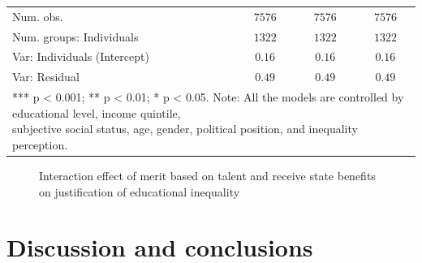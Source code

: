\documentclass[
]{article}
\begin{document}
\begin{table}
{\begin{center}
{\begin{tabular}{l c c c}
Num. obs.                              & $7576$       & $7576$       & $7576$       \\
Num. groups: Individuals               & $1322$       & $1322$       & $1322$       \\
Var: Individuals (Intercept)           & $0.16$       & $0.16$       & $0.16$       \\
Var: Residual                          & $0.49$       & $0.49$       & $0.49$       \\
\hline
\multicolumn{4}{l}{\scriptsize{\parbox[t]{\linewidth}{%
*** p < 0.001; ** p < 0.01; * p < 0.05. Note: All the models are controlled by educational level, income quintile,\\
subjective social status, age, gender, political position, and inequality perception.}}}
\end{tabular}
}
\label{table:coefficients}
\end{center}

}

\end{table}%

\begin{figure}[H]


\caption{\label{fig-interact-talent}Interaction effect of merit based on
talent and receive state benefits on justification of educational
inequality}

\end{figure}%

\section{Discussion and conclusions}\label{discussion-and-conclusions}
\end{document}

